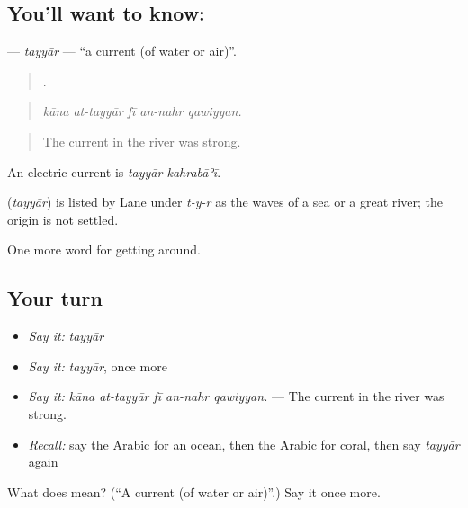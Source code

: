 \subsection*{You'll want to know: }
\textbf{} — \emph{tayyār} — \textquotedblleft{}a current (of water or air)\textquotedblright{}.

\begin{quote}
    .
\end{quote}

\begin{quote}
\emph{kāna at-tayyār fī an-nahr qawiyyan.}
\end{quote}

\begin{quote}
The current in the river was strong.
\end{quote}

An electric current is \emph{tayyār kahrabāʾī}.

\begin{cousinweb}
\textbf{} (\emph{tayyār}) is listed by Lane under \emph{t-y-r} as the waves of a sea or a great river; the origin is not settled.
\end{cousinweb}

\begin{grammarlens}[title={What you've built}]
One more word for getting around.
\end{grammarlens}

\subsection*{Your turn}
\begin{itemize}
\raggedright
  \item \emph{Say it:} \emph{tayyār}
  \item \emph{Say it:} \emph{tayyār}, once more
  \item \emph{Say it:} \emph{kāna at-tayyār fī an-nahr qawiyyan.} — The current in the river was strong.
  \item \emph{Recall:} say the Arabic for an ocean, then the Arabic for coral, then say \emph{tayyār} again
\end{itemize}

\begin{tcolorbox}[breakable,colback=teal!4,colframe=teal!35!black,title={Before you move on}]
What does  mean? (\textquotedblleft{}A current (of water or air)\textquotedblright{}.) Say it once more.
\end{tcolorbox}

